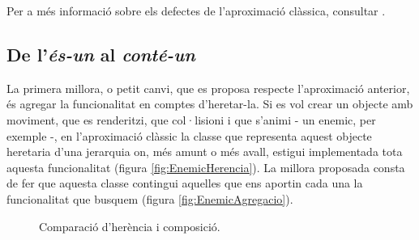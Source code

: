 Per a més informació sobre els defectes de l'aproximació clàssica, consultar \cite{Wilson02}.

\subsection{De l'{\em és-un} al {\em conté-un}}

La primera millora, o petit canvi, que es proposa respecte l'aproximació anterior, és agregar la funcionalitat en comptes d'heretar-la. Si es vol crear un objecte amb moviment, que es renderitzi, que col·lisioni i que s'animi - un enemic, per exemple -, en l'aproximació clàssic la classe que representa aquest objecte heretaria d'una jerarquia on, més amunt o més avall, estigui implementada tota aquesta funcionalitat (figura \ref{fig:EnemicHerencia}). La millora proposada consta de fer que aquesta classe contingui aquelles que ens aportin cada una la funcionalitat que busquem (figura \ref{fig:EnemicAgregacio}).

\begin{figure}
  \centering
  \hspace{0.08\textwidth}
  \caption{Comparació d'herència i composició. \label{fig:HerenciaAgregacio}}
\end{figure}

